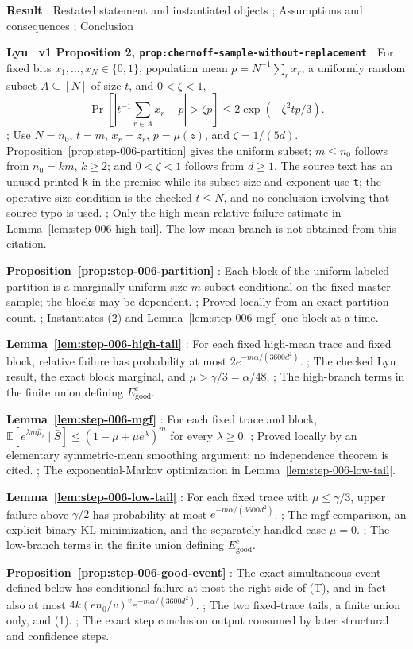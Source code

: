 \noindent\textbf{ Result }:  Restated statement and instantiated objects ;  Assumptions and consequences ;  Conclusion \par
\noindent\textbf{ Lyu~\citep{lyu2025} v1 Proposition 2, \texttt{prop:chernoff-sample-without-replacement} }:  For fixed bits \(x_1,\ldots,x_N\in\{0,1\}\), population mean \(p=N^{-1}\sum_r x_r\), a uniformly random subset \(A\subseteq[N]\) of size \(t\), and \(0<\zeta<1\), \[ \Pr\!\left[\left|t^{-1}\sum_{r\in A}x_r-p\right|>\zeta p\right] \leq2\exp(-\zeta^2tp/3). \tag{2} \] ;  Use \(N=n_0\), \(t=m\), \(x_r=z_r\), \(p=\mu(z)\), and \(\zeta=1/(5d)\).  Proposition~\ref{prop:step-006-partition} gives the uniform subset; \(m\leq n_0\) follows from \(n_0=km\), \(k\geq2\); and \(0<\zeta<1\) follows from \(d\geq1\).  The source text has an unused printed \texttt{k} in the premise while its subset size and exponent use \texttt{t}; the operative size condition is the checked \(t\leq N\), and no conclusion involving that source typo is used. ;  Only the high-mean relative failure estimate in Lemma~\ref{lem:step-006-high-tail}.  The low-mean branch is not obtained from this citation. \par
\noindent\textbf{ Proposition~\ref{prop:step-006-partition} }:  Each block of the uniform labeled partition is a marginally uniform size-\(m\) subset conditional on the fixed master sample; the blocks may be dependent. ;  Proved locally from an exact partition count. ;  Instantiates (2) and Lemma~\ref{lem:step-006-mgf} one block at a time. \par
\noindent\textbf{ Lemma~\ref{lem:step-006-high-tail} }:  For each fixed high-mean trace and fixed block, relative failure has probability at most \(2e^{-m\alpha/(3600d^2)}\). ;  The checked Lyu~\citep{lyu2025} result, the exact block marginal, and \(\mu>\gamma/3=\alpha/48\). ;  The high-branch terms in the finite union defining \(E_{\mathrm{good}}^c\). \par
\noindent\textbf{ Lemma~\ref{lem:step-006-mgf} }:  For each fixed trace and block, \(\mathbb E[e^{\lambda m\widehat\mu_i}\mid\bar S]\leq(1-\mu+\mu e^\lambda)^m\) for every \(\lambda\geq0\). ;  Proved locally by an elementary symmetric-mean smoothing argument; no independence theorem is cited. ;  The exponential-Markov optimization in Lemma~\ref{lem:step-006-low-tail}. \par
\noindent\textbf{ Lemma~\ref{lem:step-006-low-tail} }:  For each fixed trace with \(\mu\leq\gamma/3\), upper failure above \(\gamma/2\) has probability at most \(e^{-m\alpha/(3600d^2)}\). ;  The mgf comparison, an explicit binary-KL minimization, and the separately handled case \(\mu=0\). ;  The low-branch terms in the finite union defining \(E_{\mathrm{good}}^c\). \par
\noindent\textbf{ Proposition~\ref{prop:step-006-good-event} }:  The exact simultaneous event defined below has conditional failure at most the right side of (T), and in fact also at most \(4k(en_0/v)^v e^{-m\alpha/(3600d^2)}\). ;  The two fixed-trace tails, a finite union only, and  (1). ;  The exact step conclusion output consumed by later structural and confidence steps. \par

